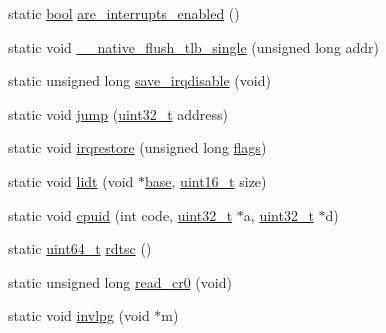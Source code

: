 \begin{DoxyCompactItemize}
\item 
static \hyperlink{a00092_af6a258d8f3ee5206d682d799316314b1_af6a258d8f3ee5206d682d799316314b1}{bool} \hyperlink{a00104_ae7df27a6150c6a020eead928af349b21_ae7df27a6150c6a020eead928af349b21}{are\+\_\+interrupts\+\_\+enabled} ()
\item 
static void \hyperlink{a00104_ad80d786594a109b21e30da4bf6f56a85_ad80d786594a109b21e30da4bf6f56a85}{\+\_\+\+\_\+native\+\_\+flush\+\_\+tlb\+\_\+single} (unsigned long addr)
\item 
static unsigned long \hyperlink{a00104_ab1dca2d7fd57d56f7548a81ef081ba74_ab1dca2d7fd57d56f7548a81ef081ba74}{save\+\_\+irqdisable} (void)
\item 
static void \hyperlink{a00104_aa090eac3bad049e35e9360403f42b565_aa090eac3bad049e35e9360403f42b565}{jump} (\hyperlink{a00092_a435d1572bf3f880d55459d9805097f62_a435d1572bf3f880d55459d9805097f62}{uint32\+\_\+t} address)
\item 
static void \hyperlink{a00104_a7dd6b2cd918b8cbca3c8b0381628ca83_a7dd6b2cd918b8cbca3c8b0381628ca83}{irqrestore} (unsigned long \hyperlink{a00065_aa2585d779da0ab21273a8d92de9a0ebe_aa2585d779da0ab21273a8d92de9a0ebe}{flags})
\item 
static void \hyperlink{a00104_a31967dec32575d3d398e6d289e888d1f_a31967dec32575d3d398e6d289e888d1f}{lidt} (void $\ast$\hyperlink{a00065_a0523cedff47e2441fc198b7770ec5d3f_a0523cedff47e2441fc198b7770ec5d3f}{base}, \hyperlink{a00092_a273cf69d639a59973b6019625df33e30_a273cf69d639a59973b6019625df33e30}{uint16\+\_\+t} size)
\item 
static void \hyperlink{a00104_adacb2a50c30267ac5314bfcb92ac1d85_adacb2a50c30267ac5314bfcb92ac1d85}{cpuid} (int code, \hyperlink{a00092_a435d1572bf3f880d55459d9805097f62_a435d1572bf3f880d55459d9805097f62}{uint32\+\_\+t} $\ast$a, \hyperlink{a00092_a435d1572bf3f880d55459d9805097f62_a435d1572bf3f880d55459d9805097f62}{uint32\+\_\+t} $\ast$d)
\item 
static \hyperlink{a00092_aa232ecf786a74ce5363c36c10798d2b1_aa232ecf786a74ce5363c36c10798d2b1}{uint64\+\_\+t} \hyperlink{a00104_a47b9d70be3022fd0b5687d9794ca47bc_a47b9d70be3022fd0b5687d9794ca47bc}{rdtsc} ()
\item 
static unsigned long \hyperlink{a00104_ac85e095222f364961e091702bb6bc2ff_ac85e095222f364961e091702bb6bc2ff}{read\+\_\+cr0} (void)
\item 
static void \hyperlink{a00104_a20faed26baa341152aa32288418f1457_a20faed26baa341152aa32288418f1457}{invlpg} (void $\ast$m)
\item 

\end{DoxyCompactItemize}
